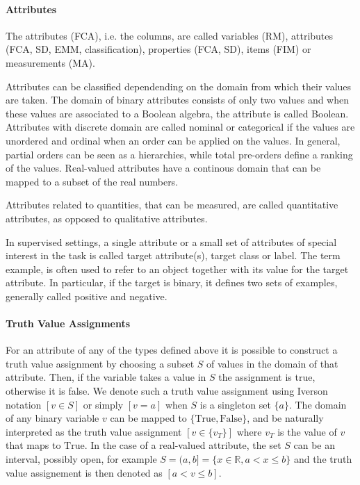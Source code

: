 \documentclass[a4paper,10pt]{article}
\begin{document}
\paragraph{Attributes}
The attributes (FCA), i.e. the columns, are called variables (RM),
attributes (FCA, SD, EMM, classification), properties (FCA, SD), items
(FIM) or measurements (MA).

Attributes can be classified dependending on the domain from which
their values are taken.  The domain of binary attributes consists of
only two values and when these values are associated to a Boolean
algebra, the attribute is called Boolean.  Attributes with discrete
domain are called nominal or categorical if the values are unordered
and ordinal when an order can be applied on the values.  In general,
partial orders can be seen as a hierarchies, while total pre-orders
define a ranking of the values.  Real-valued attributes have a
continous domain that can be mapped to a subset of the real numbers.

Attributes related to quantities, that can be measured, are called
quantitative attributes, as opposed to qualitative attributes.


In supervised settings, a single attribute or a small set of
attributes of special interest in the task is called target
attribute(s), target class or label.  The term example, is often used
to refer to an object together with its value for the target
attribute. In particular, if the target is binary, it defines two sets
of examples, generally called positive and negative.

\paragraph{Truth Value Assignments}
For an attribute of any of the types defined above it is possible to
construct a truth value assignment by choosing a subset $S$ of values
in the domain of that attribute. Then, if the variable takes a value
in $S$ the assignment is true, otherwise it is false. We denote such a
truth value assignment using Iverson notation $[v \in S]$ or simply
$[v = a]$ when $S$ is a singleton set $\{a\}$. The domain of any
binary variable $v$ can be mapped to $\{\text{True}, \text{False}\}$,
and be naturally interpreted as the truth value assignment $[v \in
\{v_T\}]$ where $v_T$ is the value of $v$ that maps to
$\text{True}$. In the case of a real-valued attribute, the set $S$ can
be an interval, possibly open, for example $S = (a,b] = \{ x \in
\mathbb{R}, a < x \leq b \}$ and the truth value assignement is then
denoted as $[ a < v \leq b]$.
\end{document}
